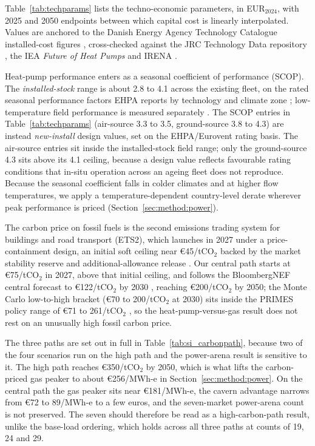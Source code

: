 Table~\ref{tab:techparams} lists the techno-economic
parameters, in EUR$_{2024}$, with 2025 and 2050 endpoints between which capital cost
is linearly interpolated. Values are anchored to the Danish Energy Agency Technology
Catalogue installed-cost figures \citep{DEA2023technology}, cross-checked against the
JRC Technology Data repository \citep{JRC2023technology,JRC2023smallheating}, the IEA
\emph{Future of Heat Pumps} \citep{IEA2022heatpumps} and IRENA
\citep{IRENA2022heatpumpcosts}.

Heat-pump performance enters as a seasonal coefficient of performance (SCOP). The \emph{installed-stock} range is about
2.8 to 4.1 across the existing fleet, on the rated seasonal performance factors EHPA
reports by technology and climate zone \citep{EHPA2023scop}; low-temperature field
performance is measured separately \citep{Gibb2023Coming}. The SCOP entries in
Table~\ref{tab:techparams} (air-source 3.3 to 3.5, ground-source 3.8 to 4.3) are instead
\emph{new-install} design values, set on the EHPA/Eurovent rating basis. The air-source
entries sit inside the installed-stock field range; only the ground-source 4.3 sits above
its 4.1 ceiling, because a design value reflects favourable rating conditions that in-situ
operation across an ageing fleet does not reproduce. Because the seasonal coefficient falls in colder climates and at higher flow
temperatures, we apply a temperature-dependent country-level derate wherever peak
performance is priced (Section~\ref{sec:method:power}).

The carbon price on fossil fuels is the second emissions trading system for buildings and road transport
(ETS2), which launches in 2027 under a price-containment design, an initial soft
ceiling near \euro{}45/tCO$_2$ backed by the market stability reserve and
additional-allowance release \citep{EuropeanCommission2024ETS2}. Our central path
starts at \euro{}75/tCO$_2$ in 2027, above that initial ceiling, and follows the
BloombergNEF central forecast to
\euro{}122/tCO$_2$ by 2030 \citep{BNEF2025ETS2}, reaching \euro{}200/tCO$_2$ by 2050;
the Monte Carlo low-to-high bracket (\euro{}70 to 200/tCO$_2$ at 2030) sits inside the PRIMES
policy range of \euro{}71 to 261/tCO$_2$ \citep{Gunther2025ets2}, so the
heat-pump-versus-gas result does not rest on an unusually high fossil carbon price.

The three paths are set out in full in Table~\ref{tab:si_carbonpath}, because two of the
four scenarios run on the high path and the power-arena result is sensitive to it. The
high path reaches \euro{}350/tCO$_2$ by 2050, which is what lifts the carbon-priced gas
peaker to about \euro{}256/MWh-e in Section~\ref{sec:method:power}. On the central path the gas
peaker sits near \euro{}181/MWh-e, the cavern advantage narrows from \euro{}72 to
89/MWh-e to a few euros, and the seven-market power-arena count is not preserved. The
seven should therefore be read as a high-carbon-path result, unlike the base-load
ordering, which holds across all three paths at counts of 19, 24 and 29.

